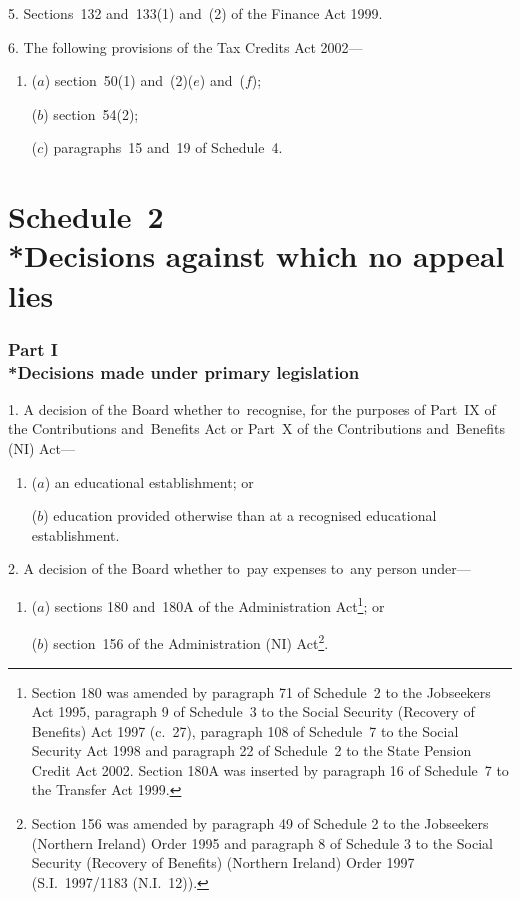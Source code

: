 \documentclass[12pt,a4paper]{article}
\begin{document}
\medskip

5.  Sections~132 and~133(1) and~(2) of the Finance Act 1999.

\medskip

6.  The following provisions of the Tax Credits Act 2002—
\begin{enumerate}\item[]
($a$) section~50(1) and~(2)($e$)  and~($f$);

($b$) section~54(2);

($c$) paragraphs~15 and~19 of Schedule~4.
\end{enumerate}

\part[Schedule~2 --- Decisions against which no appeal lies]{Schedule~2\\*Decisions against which no appeal lies}

\section[Part I --- Decisions made under primary legislation]{Part I\\*Decisions made under primary legislation}

\renewcommand\parthead{--- Schedule~2 Part I}

1.  A decision of the Board whether to~recognise, for the purposes of Part~IX of the Contributions and~Benefits Act or Part~X of the Contributions and~Benefits (NI) Act—
\begin{enumerate}\item[]
($a$) an educational establishment; or

($b$) education provided otherwise than at a recognised educational establishment.
\end{enumerate}

\medskip

2.  A decision of the Board whether to~pay expenses to~any person under—
\begin{enumerate}\item[]
($a$) sections 180 and~180A of the Administration Act\footnote{Section 180 was amended by paragraph 71 of Schedule~2 to the Jobseekers Act 1995, paragraph 9 of Schedule~3 to the Social Security (Recovery of Benefits) Act 1997 (c.~27), paragraph 108 of Schedule~7 to the Social Security Act 1998 and paragraph 22 of Schedule~2 to the State Pension Credit Act 2002. Section 180A was inserted by paragraph 16 of Schedule~7 to the Transfer Act 1999.}; or

($b$) section~156 of the Administration (NI) Act\footnote{Section 156 was amended by paragraph 49 of Schedule 2 to the Jobseekers (Northern Ireland) Order 1995 and paragraph 8 of Schedule 3 to the Social Security (Recovery of Benefits) (Northern Ireland) Order 1997 (S.I.~1997/1183 (N.I.~12)).}.
\end{enumerate}
\end{document}
